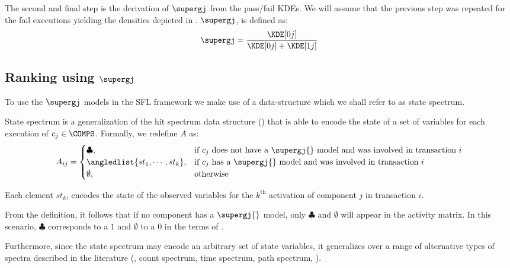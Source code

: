 The second and final step is the derivation of $\supergj$ from the
pass/fail \ac{KDE}s.
%
We will assume that the previous step was repeated for the fail
executions yielding the densities depicted in
.
%
$\supergj$, is defined as:
\begin{equation}
  \supergj = \frac{\KDE[0j]}{\KDE[0j] + \KDE[1j]}
\end{equation}


\subsection{Ranking using \texorpdfstring{$\supergj$}{gj(st)}}
\label{sec:nfge:approach:ranking}
To use the $\supergj$ models in the \ac{SFL} framework we make use of
a data-structure which we shall refer to as state spectrum.

\begin{definition}
  State spectrum is a generalization of the hit spectrum data
  structure () that is able to
  encode the state of a set of variables for each execution of
  $c_j \in \COMPS$.
  Formally, we redefine $A$ as:
  \begin{equation}
    A_{ij} = \begin{cases}
      \clubsuit, & \textrm{if $c_j$ does not have a $\supergj{}$ model and was involved in transaction $i$} \\
      \angledlist{st_{1}, \cdots, st_{k}}, & \textrm{if $c_j$ has a $\supergj{}$ model and was involved in transaction $i$}\\
      \emptyset, & \textrm{otherwise}
    \end{cases}
  \end{equation}

  Each element $st_k$, encodes the state of the observed variables for
  the $k^\text{th}$ activation of component $j$ in transaction $i$.
\end{definition}

From the definition, it follows that if no component has a
$\supergj{}$ model, only $\clubsuit$ and $\emptyset$ will appear in the
activity matrix.
%
In this scenario, $\clubsuit$ corresponds to a $1$ and $\emptyset$ to
a $0$ in the terms of .

Furthermore, since the state spectrum may encode an arbitrary set of
state variables, it generalizes over a range of alternative types of
spectra described in the literature (\eg, count spectrum, time
spectrum, path spectrum, \etc).

